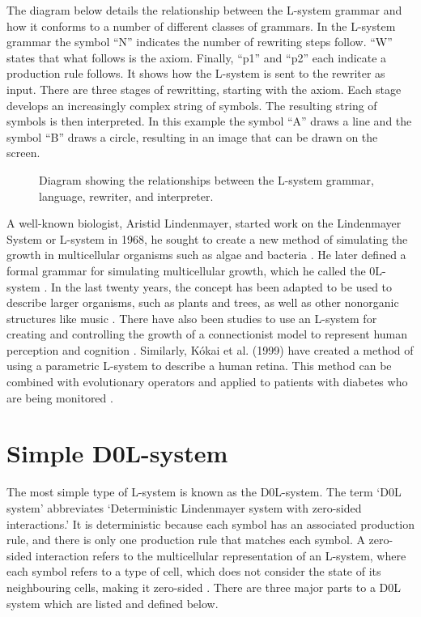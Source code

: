 The diagram below details the relationship between the L-system grammar and how it conforms to a number of different classes of grammars. In the L-system grammar the symbol ``N'' indicates the number of rewriting steps follow. ``W'' states that what follows is the axiom. Finally, ``p1'' and ``p2'' each indicate a production rule follows. It shows how the L-system is sent to the rewriter as input. There are three stages of rewritting, starting with the axiom. Each stage develops an increasingly complex string of symbols. The resulting string of symbols is then interpreted. In this example the symbol ``A'' draws a line and the symbol ``B'' draws a circle, resulting in an image that can be drawn on the screen.

\begin{figure}[htbp]
	{\centering
		\setlength{\fboxrule}{1pt}
		\vspace{7px}
		\caption{Diagram showing the relationships between the L-system grammar, language, rewriter, and interpreter.} \label{L-system relationships}
	}
\end{figure}
\FloatBarrier

\noindent
A well-known biologist, Aristid Lindenmayer, started work on the Lindenmayer System or L-system in 1968, he sought to create a new method of simulating the growth in multicellular organisms such as algae and bacteria \cite{lindenmayer1968mathematical}. He later defined a formal grammar for simulating multicellular growth, which he called the 0L-system \cite {lindenmayer1971developmental}. In the last twenty years, the concept has been adapted to be used to describe larger organisms, such as plants and trees, as well as other nonorganic structures like music \cite{worth2005growing}. There have also been studies to use an L-system for creating and controlling the growth of a connectionist model to represent human perception and cognition \cite{vaario1991connectionist}. Similarly, K{\'o}kai et al. (1999) have created a method of using a parametric L-system to describe a human retina. This method can be combined with evolutionary operators and applied to patients with diabetes who are being monitored \cite{kokai1999parametric}.

\section{Simple D0L-system} \label{Simple DOL-systems}

The most simple type of L-system is known as the D0L-system. The term `D0L system' abbreviates `Deterministic Lindenmayer system with zero-sided interactions.' It is deterministic because each symbol has an associated production rule, and there is only one production rule that matches each symbol. A zero-sided interaction refers to the multicellular representation of an L-system, where each symbol refers to a type of cell, which does not consider the state of its neighbouring cells, making it zero-sided \cite{prusinkiewicz2013lindenmayer}. 
\noindent
There are three major parts to a D0L system which are listed and defined below.


